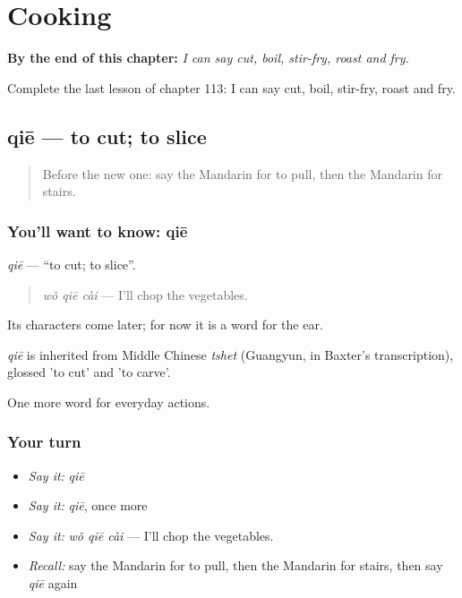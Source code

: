 
\chapter{Cooking}
\label{ch:zh-cooking}

\begin{chapteropening}
\textbf{By the end of this chapter:} \emph{I can say cut, boil, stir-fry, roast and fry.}

Complete the last lesson of chapter 113: I can say cut, boil, stir-fry, roast and fry.
\end{chapteropening}

\section[qiē]{qiē — to cut; to slice}

\label{lesson:ZH-C113-qie}



\begin{quote}
Before the new one: say the Mandarin for to pull, then the Mandarin for stairs.
\end{quote}

\subsection*{You'll want to know: qiē}
\emph{qiē} — \textquotedblleft{}to cut; to slice\textquotedblright{}.

\begin{quote}
\emph{wǒ qiē cài} — I'll chop the vegetables.
\end{quote}

Its characters come later; for now it is a word for the ear.

\begin{cousinweb}
\emph{qiē} is inherited from Middle Chinese \emph{tshet} (Guangyun, in Baxter's transcription), glossed 'to cut' and 'to carve'.
\end{cousinweb}

\begin{grammarlens}[title={What you've built}]
One more word for everyday actions.
\end{grammarlens}

\subsection*{Your turn}
\begin{itemize}
\raggedright
  \item \emph{Say it:} \emph{qiē}
  \item \emph{Say it:} \emph{qiē}, once more
  \item \emph{Say it:} \emph{wǒ qiē cài} — I'll chop the vegetables.
  \item \emph{Recall:} say the Mandarin for to pull, then the Mandarin for stairs, then say \emph{qiē} again
\end{itemize}


